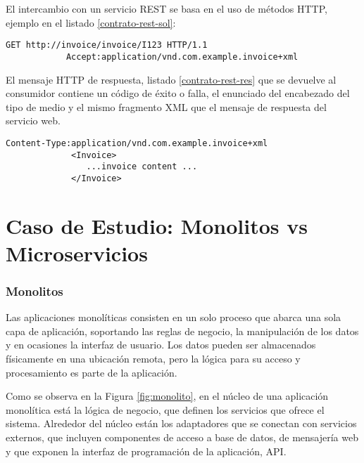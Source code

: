    
    El intercambio  con un servicio REST se basa en el uso de métodos HTTP, ejemplo en el listado \ref{contrato-rest-sol}: 
    	
    	 \begin{lstlisting}[label=contrato-rest-sol, caption=Solicitud en contrato de servicio REST]
    	 	GET http://invoice/invoice/I123 HTTP/1.1
    	 	Accept:application/vnd.com.example.invoice+xml
    	\end{lstlisting}
    	
     El mensaje HTTP de respuesta, listado \ref{contrato-rest-res} que se devuelve al consumidor contiene un código de éxito o falla, el enunciado del encabezado del tipo de medio y el mismo fragmento XML que el mensaje de respuesta del servicio web. 
    
      	 \begin{lstlisting}[label=contrato-rest-res, caption=Respuesta en contrato de servicio REST]
      	 Content-Type:application/vnd.com.example.invoice+xml
	      	 <Invoice>
	      	  	...invoice content ...
	      	 </Invoice>	  	
      	\end{lstlisting}
      	
\section{Caso de Estudio: Monolitos vs Microservicios}


\subsubsection{Monolitos}

Las aplicaciones monolíticas \cite{Richardson2016} \cite{Erl2007} consisten en un solo proceso que abarca una sola capa de aplicación, soportando las reglas de negocio, la manipulación de los datos y en ocasiones la interfaz de usuario. Los datos pueden ser almacenados físicamente en una ubicación remota, pero la lógica para su acceso y procesamiento es parte de la  aplicación.

Como se observa en la Figura \ref{fig:monolito}, en el núcleo de una aplicación monolítica está la lógica de negocio, que definen los servicios que ofrece el sistema. Alrededor del núcleo están los adaptadores que se conectan con servicios externos, que incluyen componentes de acceso a base de datos, de mensajería web y que exponen la interfaz de programación de la aplicación,  API.

